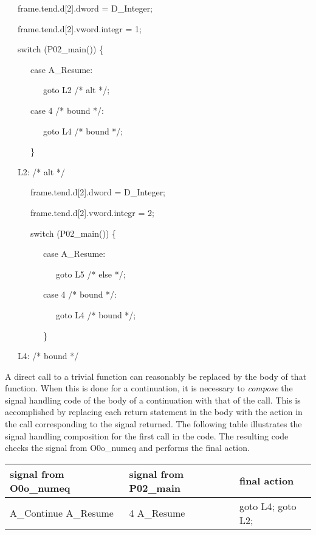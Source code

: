 {\ttfamily\mdseries
\ \ \ frame.tend.d[2].dword = D\_Integer;}

{\ttfamily\mdseries
\ \ \ frame.tend.d[2].vword.integr = 1;}

{\ttfamily\mdseries
\ \ \ switch (P02\_main()) \{}

{\ttfamily\mdseries
\ \ \ \ \ \ case A\_Resume:}

{\ttfamily\mdseries
\ \ \ \ \ \ \ \ \ goto L2 /* alt */;}

{\ttfamily\mdseries
\ \ \ \ \ \ case 4 /* bound */:}

{\ttfamily\mdseries
\ \ \ \ \ \ \ \ \ goto L4 /* bound */;}

{\ttfamily\mdseries
\ \ \ \ \ \ \}}

{\ttfamily\mdseries
\ \ \ L2: /* alt */}

{\ttfamily\mdseries
\ \ \ \ \ \ frame.tend.d[2].dword = D\_Integer;}

{\ttfamily\mdseries
\ \ \ \ \ \ frame.tend.d[2].vword.integr = 2;}

{\ttfamily\mdseries
\ \ \ \ \ \ switch (P02\_main()) \{}

{\ttfamily\mdseries
\ \ \ \ \ \ \ \ \ case A\_Resume:}

{\ttfamily\mdseries
\ \ \ \ \ \ \ \ \ \ \ \ goto L5 /* else */;}

{\ttfamily\mdseries
\ \ \ \ \ \ \ \ \ case 4 /* bound */:}

{\ttfamily\mdseries
\ \ \ \ \ \ \ \ \ \ \ \ goto L4 /* bound */;}

{\ttfamily\mdseries
\ \ \ \ \ \ \ \ \ \}}

{\ttfamily\mdseries
\ \ \ L4: /* bound */}


A direct call to a trivial function can reasonably be replaced by the
body of that function. When this is done for a continuation, it is
necessary to \textit{compose} the signal handling code of the body of
a continuation with that of the call. This is accomplished by
replacing each return statement in the body with the action in the
call corresponding to the signal returned. The following table
illustrates the signal handling composition for the first call in the
code.  The resulting code checks the signal from O0o\_numeq and
performs the final action.

\begin{center}
\tablefirsthead{}
\tablehead{}
\tabletail{}
\tablelasttail{}
\begin{xtabular}{|m{1.7879599in}|m{1.6031599in}|m{1.0469599in}|}
\hline
 signal from O0o\_numeq  &
 signal from P02\_main  &
 final action \\\hline
 A\_Continue\newline
A\_Resume  &
 4\newline
A\_Resume  &
 goto L4;\newline
goto L2; \\\hline
\end{xtabular}
\end{center}

